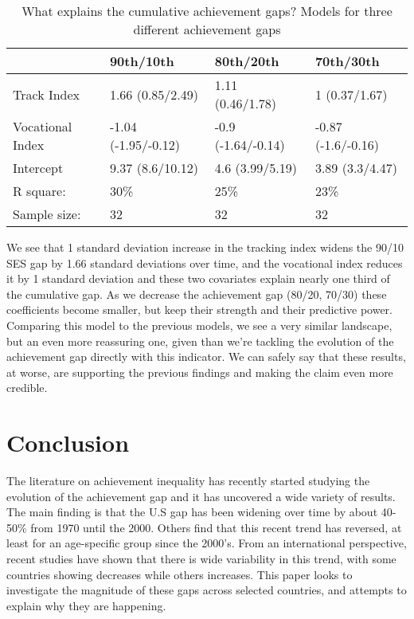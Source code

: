 \documentclass[11pt, a4paper]{article}\usepackage[]{graphicx}\usepackage[]{color}
\begin{document}
\begin{table}[ht]
\centering
\begin{tabular}{llll}
  \hline
  & 90th/10th & 80th/20th & 70th/30th \\ 
  \hline
Track Index & 1.66 (0.85/2.49) & 1.11 (0.46/1.78) & 1 (0.37/1.67) \\ 
  Vocational Index & -1.04 (-1.95/-0.12) & -0.9 (-1.64/-0.14) & -0.87 (-1.6/-0.16) \\ 
  Intercept & 9.37 (8.6/10.12) & 4.6 (3.99/5.19) & 3.89 (3.3/4.47) \\ 
   \hline R square: & 30\% & 25\% & 23\% \\ Sample size: & 32 & 32 & 32 \\ \hline \hline
\end{tabular}
\caption{What explains the cumulative achievement gaps? Models for three different achievement gaps} 
\end{table}


We see that 1 standard deviation increase in the tracking index widens the 90/10 SES gap by 1.66 standard deviations over time, and the vocational index reduces it by 1 standard deviation and these two covariates explain nearly one third of the cumulative gap. As we decrease the achievement gap (80/20, 70/30) these coefficients become smaller, but keep their strength and their predictive power. Comparing this model to the previous models, we see a very similar landscape, but an even more reassuring one, given than we're tackling the evolution of the achievement gap directly with this indicator. We can safely say that these results, at worse, are supporting the previous findings and making the claim even more credible.



\section{Conclusion}

The literature on achievement inequality has recently started studying the evolution of the achievement gap and it has uncovered a wide variety of results. The main finding is that the U.S gap has been widening over time by about 40-50\% from 1970 until the 2000. Others find that this recent trend has reversed, at least for an age-specific group since the 2000's. From an international perspective, recent studies have shown that there is wide variability in this trend, with some countries showing decreases while others increases. This paper looks to investigate the magnitude of these gaps across selected countries, and attempts to explain why they are happening.
\end{document}
